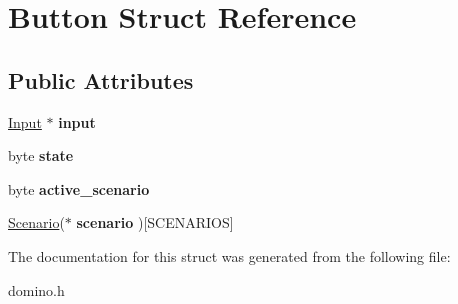 \hypertarget{struct_button}{}\section{Button Struct Reference}
\label{struct_button}
\subsection*{Public Attributes}
\begin{DoxyCompactItemize}
\item 
\hypertarget{struct_button_a5be8314b6c8692ad797a18d02d74a786}{}\hyperlink{struct_input}{Input} $\ast$ {\bfseries input}\label{struct_button_a5be8314b6c8692ad797a18d02d74a786}

\item 
\hypertarget{struct_button_a7700acc1efc21e543529846833040a35}{}byte {\bfseries state}\label{struct_button_a7700acc1efc21e543529846833040a35}

\item 
\hypertarget{struct_button_a42fd282b7efd12475e824809b5feb21c}{}byte {\bfseries active\+\_\+scenario}\label{struct_button_a42fd282b7efd12475e824809b5feb21c}

\item 
\hypertarget{struct_button_acaf9a6756976a2dc0bbf38dddc5c72ae}{}\hyperlink{struct_scenario}{Scenario}($\ast$ {\bfseries scenario} )\mbox{[}S\+C\+E\+N\+A\+R\+I\+O\+S\mbox{]}\label{struct_button_acaf9a6756976a2dc0bbf38dddc5c72ae}

\end{DoxyCompactItemize}


The documentation for this struct was generated from the following file\+:\begin{DoxyCompactItemize}
\item 
domino.\+h\end{DoxyCompactItemize}
